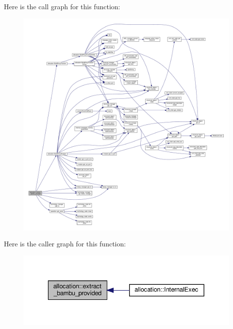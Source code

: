 Here is the call graph for this function\+:
\nopagebreak
\begin{figure}[H]
\begin{center}
\leavevmode
\includegraphics[width=350pt]{d0/d74/classallocation_a24b901da7ff60e973feddb65b2c7d23c_cgraph}
\end{center}
\end{figure}
Here is the caller graph for this function\+:
\nopagebreak
\begin{figure}[H]
\begin{center}
\leavevmode
\includegraphics[width=329pt]{d0/d74/classallocation_a24b901da7ff60e973feddb65b2c7d23c_icgraph}
\end{center}
\end{figure}
\mbox{\label{classallocation_a0bac9cf0d8365c80a4868c63398f3cd8}} 
